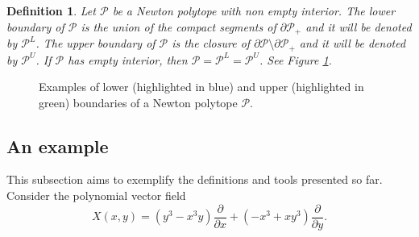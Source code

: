 \documentclass[12pt]{amsart}
\newtheorem{definition}[theorem]{Definition}
\begin{document}
\begin{definition}
Let $\mathcal{P}$ be a Newton polytope with non empty interior. The \emph{lower boundary of $\mathcal{P}$} is the union of the compact segments of $\partial\mathcal{P}_{+}$ and it will be denoted by $\mathcal{P}^{L}$. The \emph{upper boundary of $\mathcal{P}$} is the closure of $\partial\mathcal{P} \setminus \partial\mathcal{P}_{+}$ and it will be denoted by $\mathcal{P}^{U}$. If $\mathcal{P}$ has empty interior, then $\mathcal{P} = \mathcal{P}^{L} = \mathcal{P}^{U}$. See Figure \ref{fig-boundaries-polygon}.
\end{definition}



\begin{figure}[h]
\caption{\footnotesize{Examples of lower (highlighted in blue) and upper (highlighted in green) boundaries of a Newton polytope $\mathcal{P}$.}}
\label{fig-boundaries-polygon}
\end{figure}

\subsection{An example}\label{subsec-example} This subsection aims to exemplify the definitions and tools presented so far. Consider the polynomial vector field
\begin{equation*}
X(x,y) = (y^{3} - x^{3}y)\displaystyle\frac{\partial}{\partial x} + (-x^{3} + xy^{3})\displaystyle\frac{\partial}{\partial y}.   
\end{equation*}
\end{document}
